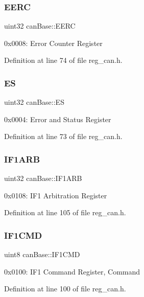 \subsubsection{\texorpdfstring{E\+E\+RC}{EERC}}
{\footnotesize\ttfamily uint32 can\+Base\+::\+E\+E\+RC}

0x0008\+: Error Counter Register 

Definition at line 74 of file reg\+\_\+can.\+h.

\mbox{\label{structcanBase_a39c63e960bd532201260f14c5e3196cd}} 
\subsubsection{\texorpdfstring{ES}{ES}}
{\footnotesize\ttfamily uint32 can\+Base\+::\+ES}

0x0004\+: Error and Status Register 

Definition at line 73 of file reg\+\_\+can.\+h.

\mbox{\label{structcanBase_a6a9c8a8f208053911833cc8108da90d8}} 
\subsubsection{\texorpdfstring{I\+F1\+A\+RB}{IF1ARB}}
{\footnotesize\ttfamily uint32 can\+Base\+::\+I\+F1\+A\+RB}

0x0108\+: I\+F1 Arbitration Register 

Definition at line 105 of file reg\+\_\+can.\+h.

\mbox{\label{structcanBase_ad2fc982cd074b1bfcf4b6c12100bc1b7}} 
\subsubsection{\texorpdfstring{I\+F1\+C\+MD}{IF1CMD}}
{\footnotesize\ttfamily uint8 can\+Base\+::\+I\+F1\+C\+MD}

0x0100\+: I\+F1 Command Register, Command 

Definition at line 100 of file reg\+\_\+can.\+h.

\mbox{\label{structcanBase_aecc56b4ee377adb082966a50f8197e2d}} 
